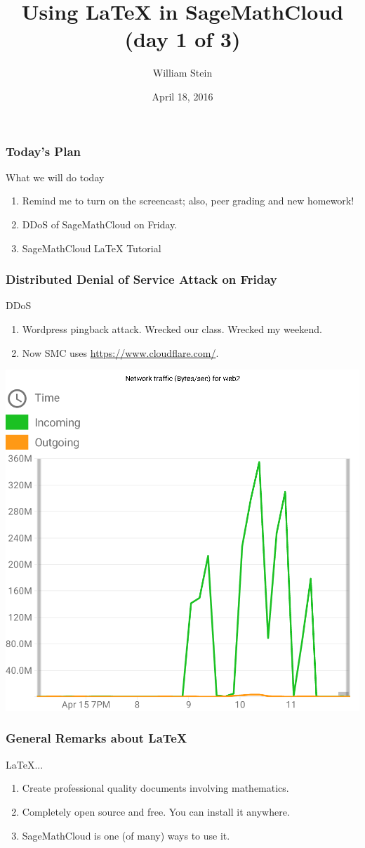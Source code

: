 \documentclass{beamer}
\title[LaTeX day 1]{Using \LaTeX{} in SageMathCloud (day 1 of 3)}
\author{William Stein}
\institute[UW]{University of Washington}
\date{April 18, 2016}
\begin{document}
\begin{frame}
\titlepage
\end{frame}



\begin{frame}
\frametitle{Today's Plan}
\begin{block}{What we will do today}
    \begin{enumerate}
    \item Remind me to turn on the screencast; also, peer grading and new homework!
    \item DDoS of SageMathCloud on Friday.
    \item SageMathCloud \LaTeX{} Tutorial
    \end{enumerate}
\end{block}
\end{frame}

\begin{frame}[fragile]
\frametitle{Distributed Denial of Service Attack on Friday}
\begin{block}{DDoS}
    \begin{enumerate}
    \item Wordpress pingback attack. Wrecked our class.  Wrecked my weekend.
    \item Now SMC uses \url{https://www.cloudflare.com/}.
    \end{enumerate}
\end{block}
\begin{center}
\includegraphics[width=.5\textwidth]{chart-NETWORK-542068901}
\end{center}
\end{frame}

\begin{frame}
\frametitle{General Remarks about \LaTeX{}}
\begin{block}{\LaTeX{}...}
\begin{enumerate}
\item Create professional quality documents involving mathematics.
\item Completely open source and free.  You can install it anywhere.
\item SageMathCloud is one (of many) ways to use it.
\end{enumerate}
\end{block}
\end{frame}
\end{document}
